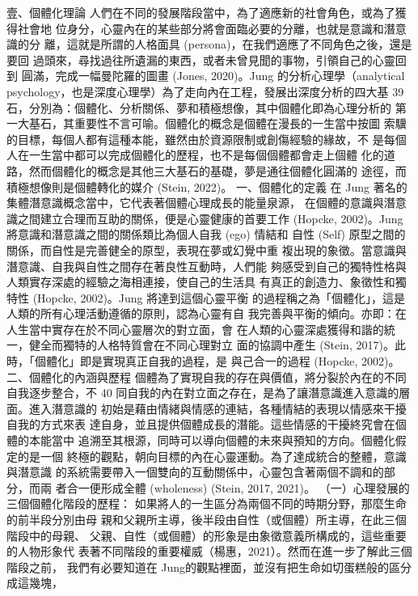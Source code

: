 壹、個體化理論 
人們在不同的發展階段當中，為了適應新的社會角色，或為了獲得社會地
位身分，心靈內在的某些部分將會面臨必要的分離，也就是意識和潛意識的分
離，這就是所謂的人格面具 (persona)，在我們適應了不同角色之後，還是要回
過頭來，尋找過往所遺漏的東西，或者未曾見聞的事物，引領自己的心靈回到
圓滿，完成一幅曼陀羅的圖畫 (Jones, 2020)。Jung 的分析心理學（analytical 
psychology，也是深度心理學）為了走向內在工程，發展出深度分析的四大基
39 
石，分別為：個體化、分析關係、夢和積極想像，其中個體化即為心理分析的
第一大基石，其重要性不言可喻。個體化的概念是個體在漫長的一生當中按圖
索驥的目標，每個人都有這種本能，雖然由於資源限制或創傷經驗的緣故，不
是每個人在一生當中都可以完成個體化的歷程，也不是每個個體都會走上個體
化的道路，然而個體化的概念是其他三大基石的基礎，夢是通往個體化圓滿的
途徑，而積極想像則是個體轉化的媒介 (Stein, 2022)。 
一、個體化的定義 
在 Jung 著名的集體潛意識概念當中，它代表著個體心理成長的能量泉源，
在個體的意識與潛意識之間建立合理而互助的關係，便是心靈健康的首要工作 
(Hopcke, 2002)。Jung 將意識和潛意識之間的關係類比為個人自我 (ego) 情結和
自性 (Self) 原型之間的關係，而自性是完善健全的原型，表現在夢或幻覺中重
複出現的象徵。當意識與潛意識、自我與自性之間存在著良性互動時，人們能
夠感受到自己的獨特性格與人類實存深處的經驗之海相連接，使自己的生活具
有真正的創造力、象徵性和獨特性 (Hopcke, 2002)。Jung 將達到這個心靈平衡
的過程稱之為「個體化」，這是人類的所有心理活動遵循的原則，認為心靈有自
我完善與平衡的傾向。亦即：在人生當中實存在於不同心靈層次的對立面，會
在人類的心靈深處獲得和諧的統一，健全而獨特的人格特質會在不同心理對立
面的協調中產生 (Stein, 2017)。此時，「個體化」即是實現真正自我的過程，是
與己合一的過程 (Hopcke, 2002)。 
二、個體化的內涵與歷程 
個體為了實現自我的存在與價值，將分裂於內在的不同自我逐步整合，不
40 
同自我的內在對立面之存在，是為了讓潛意識進入意識的層面。進入潛意識的
初始是藉由情緒與情感的連結，各種情結的表現以情感來干擾自我的方式來表
達自身，並且提供個體成長的潛能。這些情感的干擾終究會在個體的本能當中
追溯至其根源，同時可以導向個體的未來與預知的方向。個體化假定的是一個
終極的觀點，朝向目標的內在心靈運動。為了達成統合的整體，意識與潛意識
的系統需要帶入一個雙向的互動關係中，心靈包含著兩個不調和的部分，而兩
者合一便形成全體 (wholeness) (Stein, 2017, 2021)。 
（一）心理發展的三個個體化階段的歷程： 
如果將人的一生區分為兩個不同的時期分野，那麼生命的前半段分別由母
親和父親所主導，後半段由自性（或個體）所主導，在此三個階段中的母親、
父親、自性（或個體）的形象是由象徵意義所構成的，這些重要的人物形象代
表著不同階段的重要權威（楊惠，2021）。然而在進一步了解此三個階段之前，
我們有必要知道在 Jung的觀點裡面，並沒有把生命如切蛋糕般的區分成這幾塊，
